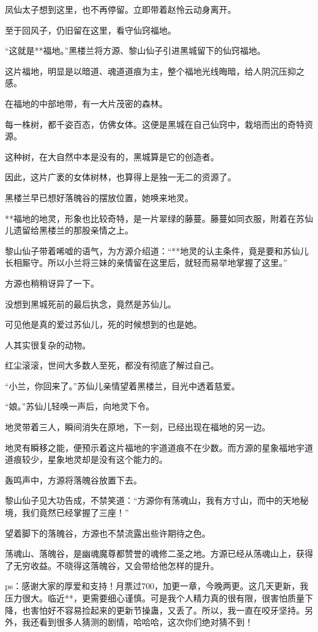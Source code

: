 \begin{this_body}
凤仙太子想到这里，也不再停留。立即带着赵怜云动身离开。

至于回风子，仍旧留在这里，看守仙窍福地。

“这就是**福地。”黑楼兰将方源、黎山仙子引进黑城留下的仙窍福地。

这片福地，明显是以暗道、魂道道痕为主，整个福地光线晦暗，给人阴沉压抑之感。

在福地的中部地带，有一大片茂密的森林。

每一株树，都千姿百态，仿佛女体。这便是黑城在自己仙窍中，栽培而出的奇特资源。

这种树，在大自然中本是没有的，黑城算是它的创造者。

因此，这片广袤的女体树林，也算得上是独一无二的资源了。

黑楼兰早已想好落魄谷的摆放位置，她唤来地灵。

**福地的地灵，形象也比较奇特，是一片翠绿的藤蔓。藤蔓如同衣服，附着在苏仙儿遗留给黑楼兰的那股亲情之上。

黎山仙子带着唏嘘的语气，为方源介绍道：“**地灵的认主条件，竟是要和苏仙儿长相厮守。所以小兰将三妹的亲情留在这里后，就轻而易举地掌握了这里。”

方源也稍稍讶异了一下。

没想到黑城死前的最后执念，竟然是苏仙儿。

可见他是真的爱过苏仙儿，死的时候想到的也是她。

人其实很复杂的动物。

红尘滚滚，世间大多数人至死，都没有彻底了解过自己。

“小兰，你回来了。”苏仙儿亲情望着黑楼兰，目光中透着慈爱。

“娘。”苏仙儿轻唤一声后，向地灵下令。

地灵带着三人，瞬间消失在原地，下一刻，已经出现在福地的另一边。

地灵有瞬移之能，便预示着这片福地的宇道道痕不在少数。而方源的星象福地宇道道痕较少，星象地灵却是没有这个能力的。

轰鸣声中，方源将落魄谷放置下去。

黎山仙子见大功告成，不禁笑道：“方源你有荡魂山，我有方寸山，而中的天地秘境，我们竟然已经掌握了三座！”

望着脚下的落魄谷，方源也不禁流露出些许期待之色。

荡魂山、落魄谷，是幽魂魔尊都赞誉的魂修二圣之地。方源已经从荡魂山上，获得了无穷收益。不晓得这落魄谷，又会带给他怎样的提升。

ps：感谢大家的厚爱和支持！月票过700，加更一章，今晚两更。这几天更新，我压力很大。临近**，更需要细心谨慎。可是我个人精力真的很有限，很害怕质量下降，也害怕好不容易捡起来的更新节操蛊，又丢了。所以，我一直在咬牙坚持。另外，我还看到很多人猜测的剧情，哈哈哈，这次你们绝对猜不到！

\end{this_body}

